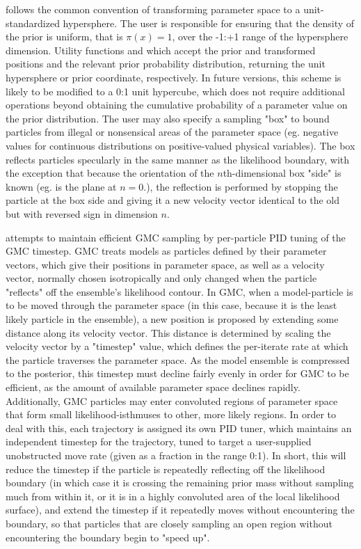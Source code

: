 follows the common convention of transforming parameter space to a unit-standardized hypersphere. The user is responsible for ensuring that the density of the prior is uniform, that is $\pi(x) = 1$, over the -1:+1 range of the hypersphere dimension. Utility functions  and  which accept the prior and transformed positions and the relevant prior probability distribution, returning the unit hypersphere or prior coordinate, respectively. In future versions, this scheme is likely to be modified to a 0:1 unit hypercube, which does not require additional operations beyond obtaining the cumulative probability of a parameter value on the prior distribution. The user may also specify a sampling "box" to bound particles from illegal or nonsensical areas of the parameter space (eg. negative values for continuous distributions on positive-valued physical variables). The box reflects particles specularly in the same manner as the likelihood boundary, with the exception that because the orientation of the $n$th-dimensional box "side" is known (eg. is the plane at $n=0$.), the reflection is performed by stopping the particle at the box side and giving it a new velocity vector identical to the old but with reversed sign in dimension $n$. 

 attempts to maintain efficient GMC sampling by per-particle PID tuning of the GMC timestep. GMC treats models as particles defined by their parameter vectors, which give their positions in parameter space, as well as a velocity vector, normally chosen isotropically and only changed when the particle "reflects" off the ensemble's likelihood contour. In GMC, when a model-particle is to be moved through the parameter space (in this case, because it is the least likely particle in the ensemble), a new position is proposed by extending some distance along its velocity vector. This distance is determined by scaling the velocity vector by a "timestep" value, which defines the per-iterate rate at which the particle traverses the parameter space. As the model ensemble is compressed to the posterior, this timestep must decline fairly evenly in order for GMC to be efficient, as the amount of available parameter space declines rapidly. Additionally, GMC particles may enter convoluted regions of parameter space that form small likelihood-isthmuses to other, more likely regions. In order to deal with this, each trajectory is assigned its own PID tuner, which maintains an independent timestep for the trajectory, tuned to target a user-supplied unobstructed move rate (given as a fraction in the range 0:1). In short, this will reduce the timestep if the particle is repeatedly reflecting off the likelihood boundary (in which case it is crossing the remaining prior mass without sampling much from within it, or it is in a highly convoluted area of the local likelihood surface), and extend the timestep if it repeatedly moves without encountering the boundary, so that particles that are closely sampling an open region without encountering the boundary begin to "speed up".

